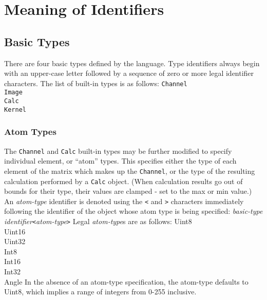 \section{Meaning of Identifiers}
\label{sec:identmeaning}

\subsection{Basic Types}
\label{ssec:types}
There are four basic types defined by the \sys{} language.
Type identifiers always begin with an upper-case letter followed by a sequence
of zero or more legal identifier characters. The list of built-in types is as follows:
\startsyn
\texttt{Channel} \\
\texttt{Image} \\
\texttt{Calc} \\
\texttt{Kernel}
\stopsyn 

\subsubsection{Atom Types}
\label{sssec:atomtypes}
The \texttt{Channel} and \texttt{Calc} built-in types may be further modified
to specify individual element, or ``atom'' types. This specifies either the type
of each element of the matrix which makes up the \texttt{Channel}, or the type
of the resulting calculation performed by a \texttt{Calc} object. (When calculation
results go out of bounds for their type, their values are clamped - set to the max or min value.)
An \emph{atom-type} identifier is denoted using the \texttt{<} and \texttt{>}
characters immediately following the identifier of the object whose atom type
is being specified:
\startsyn
\emph{basic-type} \emph{identifier}\texttt{<}\emph{atom-type}\texttt{>}
\stopsyn
Legal \emph{atom-type}s are as follows:
\startsyn
Uint8 \\
Uint16 \\
Uint32 \\
Int8 \\
Int16 \\
Int32 \\
Angle
\stopsyn
In the absence of an atom-type specification, the atom-type defaults to Uint8,
which implies a range of integers from 0-255 inclusive.

